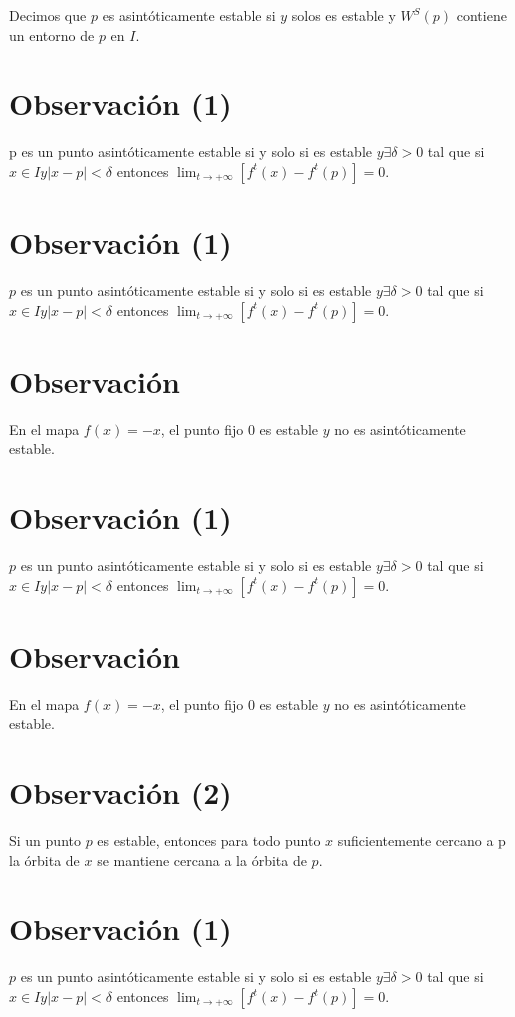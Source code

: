 \documentclass[11pt]{beamer}
\begin{document}
Decimos que $p$ es asintóticamente estable si $y$ solos es estable y $W^{S}(p)$ contiene un entorno de $p$ en $I$.

\section*{Observación (1)}
p es un punto asintóticamente estable si y solo si es estable $y \exists \delta>0$ tal que si $x \in I y|x-p|<\delta$ entonces $\lim _{t \rightarrow+\infty}\left[f^{t}(x)-f^{t}(p)\right]=0$.

\section*{Observación (1)}
$p$ es un punto asintóticamente estable si y solo si es estable $y \exists \delta>0$ tal que si $x \in I y|x-p|<\delta$ entonces $\lim _{t \rightarrow+\infty}\left[f^{t}(x)-f^{t}(p)\right]=0$.

\section*{Observación}
En el mapa $f(x)=-x$, el punto fijo 0 es estable $y$ no es asintóticamente estable.

\section*{Observación (1)}
$p$ es un punto asintóticamente estable si y solo si es estable $y \exists \delta>0$ tal que si $x \in I y|x-p|<\delta$ entonces $\lim _{t \rightarrow+\infty}\left[f^{t}(x)-f^{t}(p)\right]=0$.

\section*{Observación}
En el mapa $f(x)=-x$, el punto fijo 0 es estable $y$ no es asintóticamente estable.

\section*{Observación (2)}
Si un punto $p$ es estable, entonces para todo punto $x$ suficientemente cercano a p la órbita de $x$ se mantiene cercana a la órbita de $p$.

\section*{Observación (1)}
$p$ es un punto asintóticamente estable si y solo si es estable $y \exists \delta>0$ tal que si $x \in I y|x-p|<\delta$ entonces $\lim _{t \rightarrow+\infty}\left[f^{t}(x)-f^{t}(p)\right]=0$.
\end{document}
